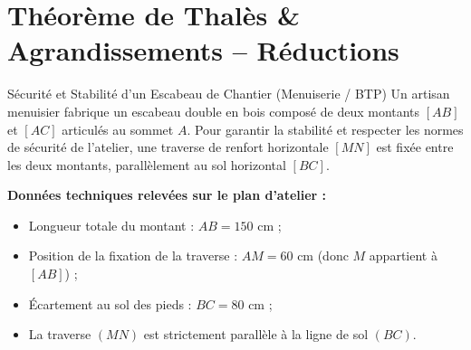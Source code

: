 \chapter{Théorème de Thalès \& Agrandissements -- Réductions}

\begin{activite}{Sécurité et Stabilité d'un Escabeau de Chantier (Menuiserie / BTP)}
Un artisan menuisier fabrique un escabeau double en bois composé de deux montants $[AB]$ et $[AC]$ articulés au sommet $A$.
Pour garantir la stabilité et respecter les normes de sécurité de l'atelier, une traverse de renfort horizontale $[MN]$ est fixée entre les deux montants, parallèlement au sol horizontal $[BC]$.

\vspace{1mm}
\begin{center}
\begin{tcolorbox}[colback=amber!10, colframe=amber!80!black, arc=4pt, boxrule=0.8pt, left=8pt, right=8pt, top=4pt, bottom=4pt]
\sffamily\footnotesize
\textbf{Données techniques relevées sur le plan d'atelier :}
\begin{itemize}[leftmargin=1.5em, itemsep=1pt]
    \item Longueur totale du montant : $AB = 150\text{ cm}$ ;
    \item Position de la fixation de la traverse : $AM = 60\text{ cm}$ (donc $M$ appartient à $[AB]$) ;
    \item Écartement au sol des pieds : $BC = 80\text{ cm}$ ;
    \item La traverse $(MN)$ est strictement parallèle à la ligne de sol $(BC)$.
\end{itemize}
\end{tcolorbox}
\end{center}

\vspace{1mm}
\noindent
\begin{minipage}[c]{0.48\linewidth}
\centering
{}
\end{minipage}
\end{activite}
